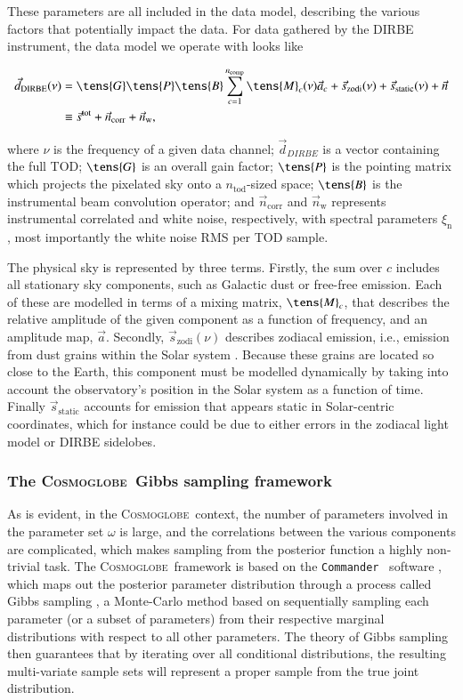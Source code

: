 \documentclass{aa}
\newcommand{\dv}[0]{\vec{d}}
\newcommand{\s}[0]{\vec{s}}
\newcommand{\M}[0]{\tens{M}}
\renewcommand{\P}[0]{\tens{P}}
\newcommand{\G}[0]{\tens{G}}
\newcommand{\B}[0]{\tens{B}}
\renewcommand{\a}[0]{\vec{a}}
\newcommand{\n}[0]{\vec{n}}
\def\Cosmoglobe{\textsc{Cosmoglobe}}
\def\Commander{\texttt{Commander} }
\begin{document}
{These parameters are all included in the data model, describing the
various factors that potentially impact the data. For data gathered by the
DIRBE instrument, the data model we operate with looks like

\begin{align}
	\label{eq:model}
    \dv_{\mathrm{DIRBE}}(\nu)
    &=\G\P\B\sum_{c=1}^{n_{\mathrm{comp}}}\M_c(\nu)\a_c+\s_{\mathrm{zodi}}(\nu) +
          \s_{\mathrm{static}}(\nu) + \n \\
                         & \equiv \s^{\mathrm{tot}} +
    \n_{\mathrm{corr}} + \n_{\mathrm{w}} \nonumber,
\end{align}

where $\nu$ is the frequency of a given data channel; $\dv_{DIRBE}$ is a vector
containing the full TOD; $\G$ is an overall gain factor; $\P$ is the
pointing matrix which projects the pixelated sky onto a
$n_{\mathrm{tod}}$-sized space; $\B$ is the instrumental beam
convolution operator; and $\n_{\mathrm{corr}}$ and $\n_{\mathrm{w}}$
represents instrumental correlated and white noise, respectively, with
spectral parameters $\xi_{\mathrm{n}}$, most importantly the white
noise RMS per TOD sample.

The physical sky is represented by three terms. Firstly, the sum over
$c$ includes all stationary sky components, such as Galactic dust or
free-free emission. Each of these are modelled in terms of a mixing
matrix, $\M_c$, that describes the relative amplitude of the given
component as a function of frequency, and an amplitude map, $\a$.
Secondly, $\s_{\mathrm{zodi}}(\nu)$ describes zodiacal emission, i.e.,
emission from dust grains within the Solar system
\citep{K98,CG02_02}. Because these grains are located so close to the
Earth, this component must be modelled dynamically by taking into
account the observatory's position in the Solar system as a function
of time. Finally $\s_{\mathrm{static}}$ accounts for emission that
appears static in Solar-centric coordinates, which for instance could
be due to either errors in the zodiacal light model or DIRBE
sidelobes. 


\subsubsection{The \Cosmoglobe\ Gibbs sampling framework}
As is evident, in the \Cosmoglobe\ context, the number of parameters involved
in the parameter set $\omega$ is large, and the correlations between the
various components are complicated, which makes sampling from the posterior
function a highly non-trivial task. The \Cosmoglobe\ framework is based on the
\Commander\ software \citep{eriksen:2004,seljebotn:2019,bp03}, which maps out
the posterior parameter distribution through a process called Gibbs sampling
\citep[e.g.,][]{geman:1984}, a Monte-Carlo method based on sequentially
sampling each parameter (or a subset of parameters) from their respective
marginal distributions with respect to all other parameters. The theory of
Gibbs sampling then guarantees that by iterating over all conditional
distributions, the resulting multi-variate sample sets will represent a proper
sample from the true joint distribution. 

}
\end{document}
